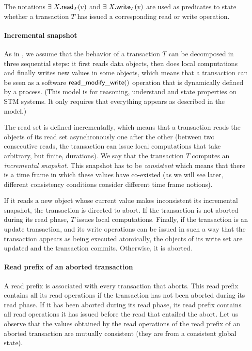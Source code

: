 The notations $\exists~ X.{\sf read}_T(v)$  and $\exists~ X.{\sf write}_T(v)$ 
are  used as  predicates to  state whether a transaction  $T$ has issued a
corresponding read or write operation. 

\paragraph{Incremental snapshot}
As  in \cite{BSW79},  we assume  that the behavior of a transaction $T$  
can be decomposed in  three sequential steps:  
it first reads  data objects,  then does local computations and 
finally   writes  new values  in some  objects, which means
that  a  transaction can  be  seen as  a software 
${\sf read\_modify\_write()}$ operation that is 
dynamically defined  by  a process. (This model is for 
reasoning, understand and  state properties on STM systems.  
It only requires that everything appears as described  in the model.)


The read set is  defined  incrementally,  which  means  that a 
transaction  reads  the objects of  its read set  asynchronously  one after
the other (between  two consecutive reads, the transaction 
can  issue local  computations   that  take  arbitrary, but finite,
durations). We  say  that the  transaction $T$ computes an  {\it incremental
snapshot}.  This snapshot has to be {\it consistent} which
means that there is a time frame in which these values have co-existed 
(as we will see later, different consistency conditions consider different  
time frame  notions). 

If it reads  a  new  object whose  current  value makes  inconsistent  its 
incremental snapshot, the transaction   is  directed to  abort. 
If the transaction is not aborted during its read 
phase, $T$ issues local computations. Finally,  if the transaction  is  
an update transaction, and its  write operations  can be issued 
in  such a way that the transaction  appears as  being executed
atomically,   the objects of its write set are updated  and the transaction
 commits.   Otherwise, it  is  aborted.

\paragraph{Read prefix of an aborted transaction}
A read prefix is associated with every transaction that aborts.
This read prefix contains all its read operations if the transaction 
has not been aborted  during its read phase.  If it has been  aborted during 
its read phase, its read prefix contains all read operations it has issued 
before the read that entailed the abort.  Let us observe that the values 
obtained by the read operations of the read prefix of an aborted transaction 
are mutually consistent (they are from a consistent global state). 


